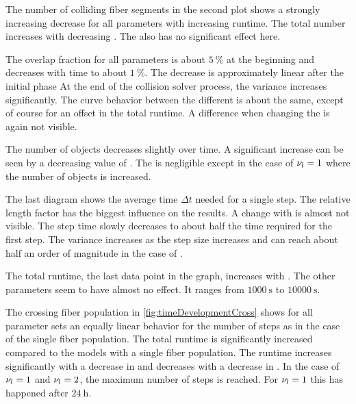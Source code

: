\par
%
The number of colliding fiber segments in the second plot shows a strongly increasing decrease for all parameters with increasing runtime.
The total number increases with decreasing \segLengthFactor{}.
The \segRadiusFactor{} also has no significant effect here.
\par
%
The overlap fraction for all parameters is about $\SI{5}{\percent}$ at the beginning and decreases with time to about $\SI{1}{\percent}$.
The decrease is approximately linear after the initial phase
At the end of the collision solver process, the variance increases significantly.
The curve behavior between the different \segLengthFactor{} is about the same, except of course for an offset in the total runtime.
A difference when changing the \segRadiusFactor{} is again not visible.
\par
%
The number of objects decreases slightly over time.
A significant increase can be seen by a decreasing value of \segLengthFactor{}.
The \segRadiusFactor{} is negligible except in the case of $\textnormal{$\nu_{l}$} = \SI{1}{}$ where the number of objects is increased.
\par
%
The last diagram shows the average time $\Delta t$ needed for a single step.
The relative length factor \segLengthFactor{} has the biggest influence on the results.
A change with \segRadiusFactor{} is almost not visible.
The step time slowly decreases to about half the time required for the first step.
The variance increases as the step size increases and can reach about half an order of magnitude in the case of \segLengthFactor{}.
\par
%
The total runtime, \ie{} the last data point in the graph, increases with \segLengthFactor{}.
The other parameters seem to have almost no effect.
It ranges from $\SI{1000}{\second}$ to $\SI{10000}{\second}$.
\par
%
The crossing fiber population \cfbs{} in \cref{fig:timeDevelopmentCross} shows for all parameter sets an equally linear behavior for the number of steps as in the case of the single fiber population.
The total runtime is significantly increased compared to the models with a single fiber population.
The runtime increases significantly with a decrease in \segLengthFactor{} and decreases with a decrease in \segRadiusFactor{}.
In the case of $\textnormal{$\nu_{l}$} = \SI{1}{}$ and $\textnormal{$\nu_{l}$} = \SI{2}{}$, the maximum number of steps is reached.
For $\textnormal{$\nu_{l}$} = \SI{1}{}$ this has happened after $\SI{24}{\hour}$.
\par
